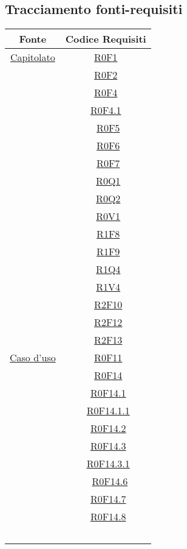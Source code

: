 \documentclass[../AnalisiDeiRequisiti.tex]{subfiles}
\begin{document}
\subsection{Tracciamento fonti-requisiti}
\normalsize
\begin{longtable}{|c|c|}
	\hline
	\textbf{Fonte} & \textbf{Codice Requisiti} \\
	\hline
	\endhead
	\hyperlink{Capitolato}{Capitolato} & \hyperlink{R0F1}{R0F1}\\& \hyperlink{R0F2}{R0F2}\\&
	\hyperlink{R0F4}{R0F4}\\&
	\hyperlink{R0F4.1}{R0F4.1}\\& \
	\hyperlink{R0F5}{R0F5}\\& \
	\hyperlink{R0F6}{R0F6}\\& \
	\hyperlink{R0F7}{R0F7}\\& \
	\hyperlink{R0Q1}{R0Q1}\\& \
	\hyperlink{R0Q2}{R0Q2}\\& \
	\hyperlink{R0V1}{R0V1}\\& \
	\hyperlink{R1F8}{R1F8}\\& \
	\hyperlink{R1F9}{R1F9}\\& \
	\hyperlink{R1Q4}{R1Q4}\\& \
	\hyperlink{R1V4}{R1V4}\\& \
	\hyperlink{R2F10}{R2F10}\\& \
	\hyperlink{R2F12}{R2F12}\\& \
	\hyperlink{R2F13}{R2F13}\\\hline
	\hyperlink{Caso d'uso}{Caso d'uso} & \
	\hyperlink{R0F11}{R0F11}\\& \
	\hyperlink{R0F14}{R0F14}\\& \
	\hyperlink{R0F14.1}{R0F14.1}\\& \
	\hyperlink{R0F14.1.1}{R0F14.1.1}\\& \
	\hyperlink{R0F14.2}{R0F14.2}\\& \
	\hyperlink{R0F14.3}{R0F14.3}\\& \
	\hyperlink{R0F14.3.1}{R0F14.3.1}\\& \
	\hyperlink{R0F14.6}{R0F14.6}\\& \
	\hyperlink{R0F14.7}{R0F14.7}\\& \
	\hyperlink{R0F14.8}{R0F14.8}\\& \

\end{longtable}
\end{document}
